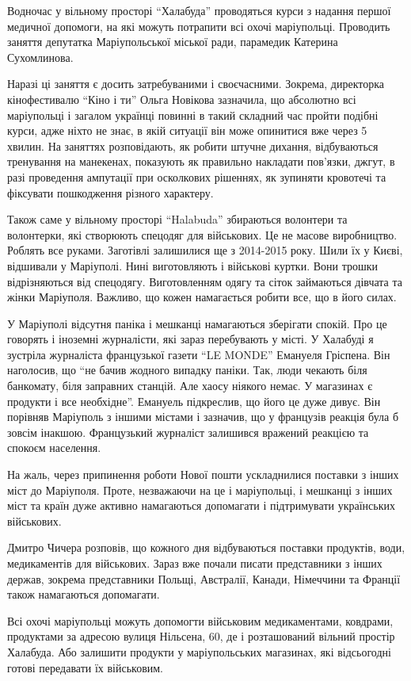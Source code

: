 Водночас у вільному просторі \enquote{Халабуда} проводяться курси з надання першої
медичної допомоги, на які можуть потрапити всі охочі маріупольці. Проводить
заняття депутатка Маріупольської міської ради, парамедик Катерина Сухомлинова.


Наразі ці заняття є досить затребуваними і своєчасними. Зокрема, директорка
кінофестивалю \enquote{Кіно і ти} Ольга Новікова зазначила, що абсолютно всі
маріупольці і загалом українці повинні в такий складний час пройти подібні
курси, адже ніхто не знає, в якій ситуації він може опинитися вже через 5
хвилин. На заняттях розповідають, як робити штучне дихання, відбуваються
тренування на манекенах, показують як правильно накладати пов'язки, джгут, в
разі проведення ампутації при осколкових рішеннях, як зупиняти кровотечі та
фіксувати пошкодження різного характеру.


Також саме у вільному просторі \enquote{Halabuda} збираються волонтери та волонтерки,
які створюють спецодяг для військових. Це не масове виробництво. Роблять все
руками. Заготівлі залишилися ще з 2014-2015 року. Шили їх у Києві, відшивали у
Маріуполі. Нині виготовляють і військові куртки. Вони трошки відрізняються від
спецодягу. Виготовленням одягу та сіток займаються дівчата та жінки Маріуполя.
Важливо, що кожен намагається робити все, що в його силах.

У Маріуполі відсутня паніка і мешканці  намагаються зберігати спокій. Про це
говорять і іноземні журналісти, які зараз перебувають у місті. У Халабуді я
зустріла журналіста французької газети \enquote{LE MONDE} Емануеля Гріспена. Він
наголосив, що \enquote{не бачив  жодного випадку паніки. Так, люди чекають біля
банкомату, біля заправних станцій. Але хаосу ніякого немає. У магазинах є
продукти і все необхідне}. Емануель підкреслив, що його це дуже дивує. Він
порівняв Маріуполь з іншими містами і зазначив, що у французів реакція була б
зовсім інакшою. Французький журналіст залишився вражений реакцією та спокоєм
населення.


На жаль, через припинення роботи Нової пошти ускладнилися поставки з інших міст
до Маріуполя. Проте, незважаючи на це і маріупольці, і мешканці з інших міст
та країн дуже активно намагаються допомагати і підтримувати українських
військових.

Дмитро Чичера розповів, що кожного дня відбуваються поставки продуктів, води,
медикаментів для військових. Зараз вже почали писати представники з інших
держав, зокрема представники Польщі, Австралії, Канади, Німеччини та Франції
також намагаються допомагати.

Всі охочі маріупольці можуть допомогти військовим медикаментами, ковдрами,
продуктами  за адресою вулиця Нільсена, 60, де і розташований вільний простір
Халабуда. Або залишити продукти у маріупольських магазинах, які відсьогодні
готові передавати їх військовим.
